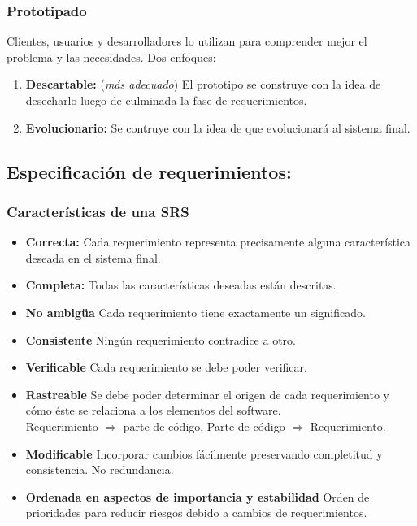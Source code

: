     \PN\subsubsection{Prototipado}
      Clientes, usuarios y desarrolladores lo utilizan para comprender mejor el problema y las necesidades.
      Dos enfoques:
      \begin{enumerate}
        \item \textbf{Descartable:} (\textit{más adecuado}) El prototipo se construye con la idea de desecharlo luego de
              culminada la fase de requerimientos.
        \item \textbf{Evolucionario:} Se contruye con la idea de que evolucionará al sistema final.
      \end{enumerate}

  \subsection{Especificación de requerimientos:}
    \subsubsection{Características de una SRS}
    \begin{itemize}
      \item \textbf{Correcta:}  Cada requerimiento representa precisamente alguna característica deseada en
                                el sistema final.
      \item \textbf{Completa:} Todas las características deseadas están descritas.
      \item \textbf{No ambigüa} Cada requerimiento tiene exactamente un significado.
      \item \textbf{Consistente} Ningún requerimiento contradice a otro.
      \item \textbf{Verificable} Cada requerimiento se debe poder verificar.
      \item \textbf{Rastreable} Se debe poder determinar el origen de cada requerimiento y cómo éste se relaciona a los
                                elementos del software. \\
                                Requerimiento $\Rightarrow$ parte de código, 
                                Parte de código $\Rightarrow$ Requerimiento.
      \item \textbf{Modificable} Incorporar cambios fácilmente preservando completitud y consistencia. No redundancia.
      \item \textbf{Ordenada en aspectos de importancia y estabilidad} Orden de prioridades para reducir riesgos debido
                                                                       a cambios de requerimientos.
    \end{itemize}

